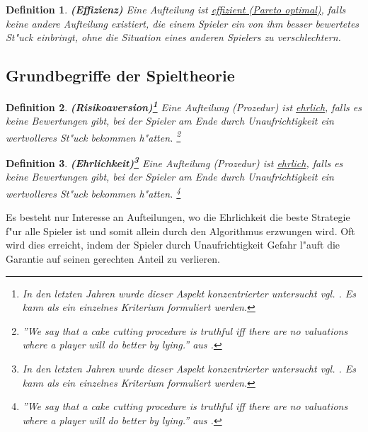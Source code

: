 \documentclass[11pt, a4paper, twoside]{article}
\newtheorem*{defi}{Definition}
\numberwithin{equation}{section}
\begin{document}
\begin{defi}{\textbf{(Effizienz)}}
\newline Eine Aufteilung ist \underline{effizient (Pareto optimal)}, falls keine andere Aufteilung existiert, die einem Spieler ein von ihm besser bewertetes St"uck einbringt, ohne die Situation eines anderen Spielers zu verschlechtern. 
\end{defi}
\subsection{Grundbegriffe der Spieltheorie}
\begin{defi}{\textbf{(Risikoaversion)\footnote{In den letzten Jahren wurde dieser Aspekt konzentrierter untersucht vgl. \cite{23}. Es kann als ein einzelnes Kriterium formuliert werden.}}}
\newline Eine Aufteilung (Prozedur) ist \underline{ehrlich}, falls es keine Bewertungen gibt, bei der Spieler am Ende durch Unaufrichtigkeit ein wertvolleres St"uck bekommen h"atten. \footnote{''We say that a cake cutting procedure is truthful iff there are no valuations where a player will do better by lying.'' aus \cite{41}.}
\end{defi}
\begin{defi}{\textbf{(Ehrlichkeit)\footnote{In den letzten Jahren wurde dieser Aspekt konzentrierter untersucht vgl. \cite{23}. Es kann als ein einzelnes Kriterium formuliert werden.}}}
\newline Eine Aufteilung (Prozedur) ist \underline{ehrlich}, falls es keine Bewertungen gibt, bei der Spieler am Ende durch Unaufrichtigkeit ein wertvolleres St"uck bekommen h"atten. \footnote{''We say that a cake cutting procedure is truthful iff there are no valuations where a player will do better by lying.'' aus \cite{41}.}
\end{defi}
Es besteht nur Interesse an Aufteilungen, wo die Ehrlichkeit die beste Strategie f"ur alle Spieler ist und somit allein durch den Algorithmus erzwungen wird. Oft wird dies erreicht, indem der Spieler durch Unaufrichtigkeit Gefahr l"auft die Garantie auf seinen gerechten Anteil zu verlieren.\\
\end{document}
